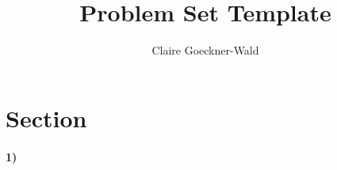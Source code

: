 \documentclass[10pt,letter]{article}
\begin{document}
\title{Problem Set Template}
\author{Claire Goeckner-Wald}
\maketitle 

\section*{Section}

\paragraph{1)} 
\end{document}
